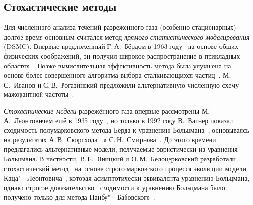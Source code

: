 \subsection{Стохастические методы}

Для численного анализа течений разрежённого газа (особенно стационарных) долгое время основным
считался метод \emph{прямого статистического моделирования} (DSMC).
Впервые предложенный Г.\,А.~Бёрдом в 1963 году~\cite{Bird1963} на основе общих физических соображений,
он получил широкое распространение в прикладных областях~\cite{Bird1994}.
Позже вычислительная эффективность метода была улучшена на основе более совершенного алгоритма
выбора сталкивающихся частиц~\cite{Bird1989}.
М.\,С.~Иванов и С.\,В.~Рогазинский предложили альтернативную численную схему мажорантной частоты~\cite{Ivanov1988}.

\emph{Стохастические модели} разрежённого газа впервые рассмотрены М.\,А.~Леонтовичем
ещё в 1935 году~\cite{Leontovich1935}, но только в 1992 году В.~Вагнер показал сходимость
полумарковского метода Бёрда к уравнению Больцмана~\cite{Wagner1992},
основываясь на результатах А.\,В.~Скорохода~\cite{Skorokhod1983} и С.\,Н.~Смирнова~\cite{Smirnov1989}.
До этого времени предлагались альтернативные модели, получаемые эвристически из уравнения Больцмана.
В частности, В.\,Е.~Яницкий и О.\,М.~Белоцерковский разработали стохастический метод~\cite{Yanitskij1975}
на основе строго марковского процесса эволюции модели Каца"--~Леонтовича~\cite{Kac1965, Kac1973},
которая асимптотически эквивалента уравнению Больцмана, однако строгое доказательство~\cite{Babovsky1989}
сходимости к уравнению Больцмана было получено только для метода Нанбу"--~Бабовского~\cite{Nanbu1980, Babovsky1986}.

